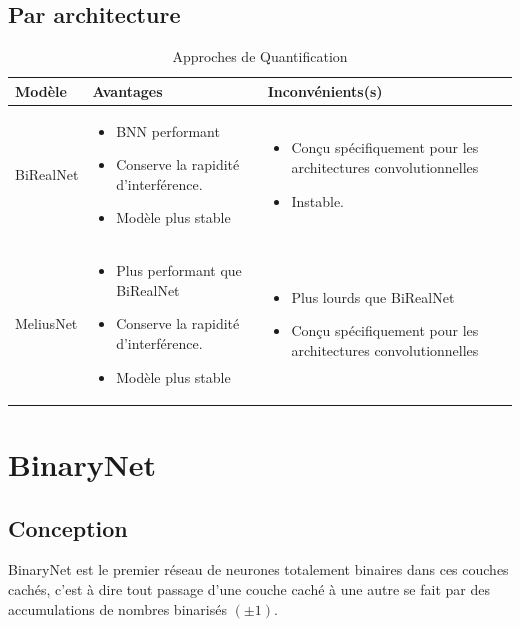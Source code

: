 \subsection{Par architecture}
\begin{table}[h]
	\small
	\begin{tabularx}{\textwidth}{| p{2.5cm} | X | X |}
		\hline
		
		Modèle & Avantages & Inconvénients(s)  \\
		\hline 
		BiRealNet\cite{BiRealNetPaper} & \begin{itemize}
			\item BNN performant
			\item Conserve la rapidité d'interférence.
			\item Modèle plus stable
		\end{itemize} & \begin{itemize}
			\item Conçu spécifiquement pour les architectures convolutionnelles
			\item Instable.
		\end{itemize} \\
		\hline  
		MeliusNet & \begin{itemize}
			\item Plus performant que BiRealNet
			\item Conserve la rapidité d'interférence.
			\item Modèle plus stable
		\end{itemize} & \begin{itemize}
			\item Plus lourds que BiRealNet
			\item Conçu spécifiquement pour les architectures convolutionnelles
		\end{itemize} \\
		\hline
	\end{tabularx}
	\caption{Approches de Quantification}
\end{table}
\FloatBarrier
\newpage
\section{BinaryNet}
\subsection{Conception}
BinaryNet\cite{BinaryNetPaper} est le premier réseau de neurones totalement binaires dans ces couches cachés, c'est à dire tout passage d'une couche caché à une autre se fait par des accumulations de nombres binarisés $(\pm 1).$

